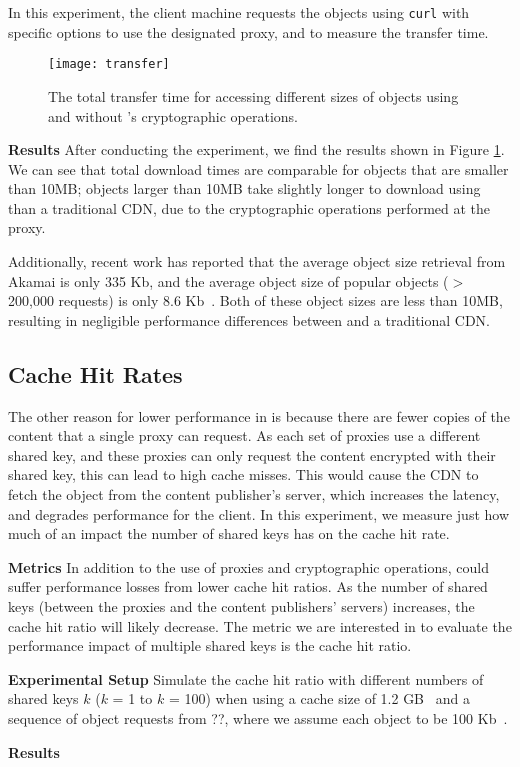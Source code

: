 In this experiment, the client machine requests the objects using {\tt curl} with specific options to use the designated proxy, 
and to measure the transfer time.  

\begin{figure}[t]
\centering
\texttt{[image: transfer]}
\caption{The total transfer time for accessing different sizes of objects using \system{} and without \system{}'s cryptographic operations.}
\label{fig:transfer}
\end{figure}

{\bf Results}
After conducting the experiment, we find the results shown in Figure \ref{fig:transfer}.  We can see that total download times are comparable 
for objects that are smaller than 10MB; objects larger than 10MB take slightly longer to download using \system{} than a traditional CDN, 
due to the cryptographic operations performed at the proxy.  

Additionally, recent work has reported that the average object size retrieval from Akamai is only 335 Kb, and the average object size 
of popular objects ($>$ 200,000 requests) is only 8.6 Kb~\cite{berger2016achieving}.  Both of these object sizes are less than 10MB, resulting in negligible 
performance differences between \system{} and a traditional CDN.

\subsection{Cache Hit Rates}
The other reason for lower performance in \system{} is because there are fewer copies of the content that a single proxy can request.  As each set 
of proxies use a different shared key, and these proxies can only request the content encrypted with their shared key, this can lead to high cache misses.  
This would cause the CDN to fetch the object from the content publisher's server, which increases the latency, and degrades performance for the client.  
In this experiment, we measure just how much of an impact the number of shared keys has on the cache hit rate.

{\bf Metrics}
In addition to the use of proxies and cryptographic operations, \system{} could suffer performance losses from lower cache hit ratios.  As the number 
of shared keys (between the proxies and the content publishers' servers) increases, the cache hit ratio will likely decrease.  The metric we are interested 
in to evaluate the performance impact of multiple shared keys is the cache hit ratio.

{\bf Experimental Setup}
Simulate the cache hit ratio with different numbers of shared keys $k$ ($k$ = 1 to $k$ = 100) when using a cache size of 1.2 GB~\cite{berger2017adaptsize} and a sequence of object requests from ??, where we assume each object to be 100 Kb~\cite{berger2016achieving}.

{\bf Results}
